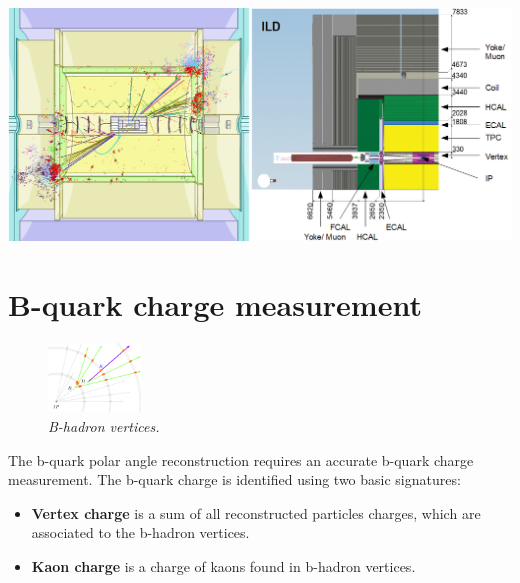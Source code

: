 \begin{center}\vspace{1.8cm}
	\centering
	
	\includegraphics[width=1.\linewidth]{figures/ild3.png}
	\label{fig:ILDScheme}
\end{center}\vspace{1cm}

\color{DarkSlateGray} %

\section*{B-quark charge measurement}
\setlength{\columnsep}{20pt}%
\begin{figure}
	
	\includegraphics[width=0.22\textwidth]{figures/vtx.pdf}
	\caption{\sl B-hadron vertices.}
	\label{fig:vtx}

\end{figure}

\color{Blue}
The b-quark polar angle reconstruction requires an accurate b-quark charge measurement. 
The b-quark charge is identified using two basic signatures:
\begin{itemize}
	\item \textbf{Vertex charge} is a sum of all reconstructed particles charges, which are associated to the b-hadron vertices. 
	\item \textbf{Kaon charge} is a charge of kaons found in b-hadron vertices. 
\end{itemize}

